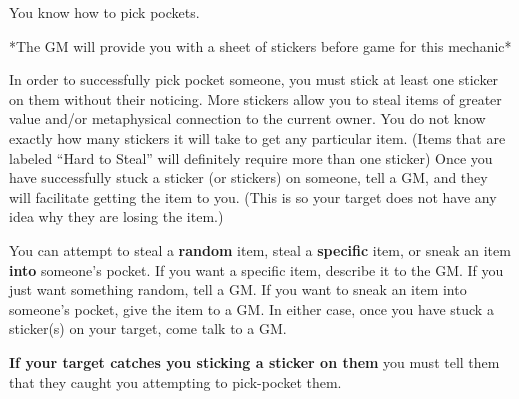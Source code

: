 \documentclass[green]{Katmeers}
\begin{document}
\name{\gPickPockets{}}

You know how to pick pockets.

*The GM will provide you with a sheet of stickers before game for this mechanic*

In order to successfully pick pocket someone, you must stick at least one sticker on them without their noticing. More stickers allow you to steal items of greater value and/or metaphysical connection to the current owner. You do not know exactly how many stickers it will take to get any particular item. (Items that are labeled ``Hard to Steal'' will definitely require more than one sticker) Once you have successfully stuck a sticker (or stickers) on someone, tell a GM, and they will facilitate getting the item to you. (This is so your target does not have any idea why they are losing the item.)

You can attempt to steal a {\bf random} item, steal a {\bf specific} item, or sneak an item {\bf into} someone's pocket. If you want a specific item, describe it to the GM. If you just want something random, tell a GM. If you want to sneak an item into someone's pocket, give the item to a GM. In either case, once you have stuck a sticker(s) on your target, come talk to a GM.

{\bf If your target catches you sticking a sticker on them} you must tell them that they caught you attempting to pick-pocket them.
\end{document}
